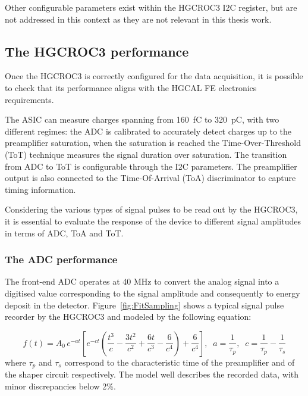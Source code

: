 \bigbreak

Other configurable parameters exist within the HGCROC3 I2C register, but are not addressed in this context as they are not relevant in this thesis work.

\subsection{The HGCROC3 performance}
\label{subsec:The HGCROC3 performance}

Once the HGCROC3 is correctly configured for the data acquisition, it is possible to check that its performance aligns with the HGCAL FE electronics requirements.

The ASIC can measure charges spanning from 160~fC to 320~pC, with two different regimes: the ADC is calibrated to accurately detect charges up to the preamplifier saturation, when the saturation is reached the Time-Over-Threshold (ToT) technique measures the signal duration over saturation. The transition from ADC to ToT is configurable through the I2C parameters. The preamplifier output is also connected to the Time-Of-Arrival (ToA) discriminator to capture timing information. 

Considering the various types of signal pulses to be read out by the HGCROC3, it is essential to evaluate the response of the device to different signal amplitudes in terms of ADC, ToA and ToT.

\subsubsection{The ADC performance}
\label{subsubsec:The ADC performance}

The front-end ADC operates at 40 MHz to convert the analog signal into a digitised value corresponding to the signal amplitude and consequently to energy deposit in the detector. 
Figure~\ref{fig:FitSampling} shows a typical signal pulse recorder by the HGCROC3 and modeled by the following equation:

\begin{equation}
    f(t) = A_{0}\,e^{-at}\left[e^{-ct}\left(\frac{t^3}{c}-\frac{3t^2}{c^2}+\frac{6t}{c^3}-\frac{6}{c^4}\right)+\frac{6}{c^4}\right], \;\; a =\frac{1}{\tau_{p}}, \;\; c=\frac{1}{\tau_{p}}-\frac{1}{\tau_{s}}
\label{eq:FitSampling}
\end{equation}
where $\tau_{p}$ and $\tau_{s}$ correspond to the characteristic time of the preamplifier and of the shaper circuit respectively.
The model well describes the recorded data, with minor discrepancies below 2\%.

